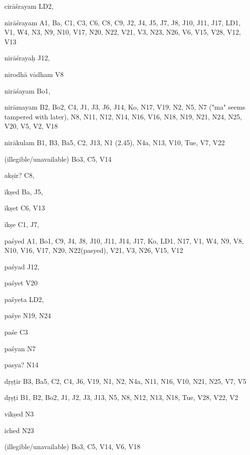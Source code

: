 \begin{ekdosis}
\begin{marma}[hp01_055]
\begin{marma}[hp02_009]
\begin{marma}[hp02_011]
      \begin{marma}[hp02_40b]
      \item[cirāśrayam] LD2,
      \item[nirāśrayam] A1, Ba, C1, C3, C6, C8, C9, J2, J4, J5, J7, J8, J10, J11, J17, LD1, V1, W4, N3, N9, N10, V17, N20, N22, V21, V3, N23, N26, V6, V15, V28, V12, V13
      \item[nirāśrayaḥ] J12,
      \item[nirodhā vādham] V8
      \item[nirāśayam] Bo1,
      \item[nirāmayam] B2, Bo2, C4, J1, J3, J6, J14, Ko, N17, V19, N2, N5, N7 ("ma" seems tampered with later), N8, N11, N12, N14, N16, V16, N18, N19, N21, N24, N25, V20, V5, V2, V18
      \item[nirākulam] B1, B3, Ba5, C2, J13, N1 (2.45), N4a, N13, V10, Tue, V7, V22
      \item[(illegible/unavailable)] Bo3, C5, V14
        \begin{description}

        \end{description}
      \end{marma}

      \begin{marma}[hp02_40c]
      \item[akṣir?] C8,
      \item[īkṣed] Ba, J5, 
      \item[īkṣet] C6, V13
      \item[īkṣe] C1, J7, 
      \item[paśyed] A1, Bo1, C9, J4, J8, J10, J11, J14, J17, Ko, LD1, N17, V1, W4, N9, V8, N10, V16, V17, N20, N22(pasyed), V21, V3, N26, V15, V12
      \item[paśyad] J12,
      \item[paśyet] V20
      \item[paśyeta] LD2,
      \item[paśye] N19, N24
      \item[paśe] C3
      \item[paśyan] N7
      \item[pasya?] N14  
      \item[dṛṣṭir] B3, Ba5, C2, C4, J6, V19, N1, N2, N4a, N11, N16, V10, N21, N25, V7, V5
      \item[dṛṣṭi] B1, B2, Bo2, J1, J2, J3, J13, N5, N8, N12, N13, N18, Tue, V28, V22, V2 
      \item[vīkṣed] N3
      \item[iched] N23
      \item[(illegible/unavailable)] Bo3, C5, V14, V6, V18
        \begin{description}


\end{description}
\end{marma}
\end{marma}
\end{marma}
\end{marma}
\end{ekdosis}
